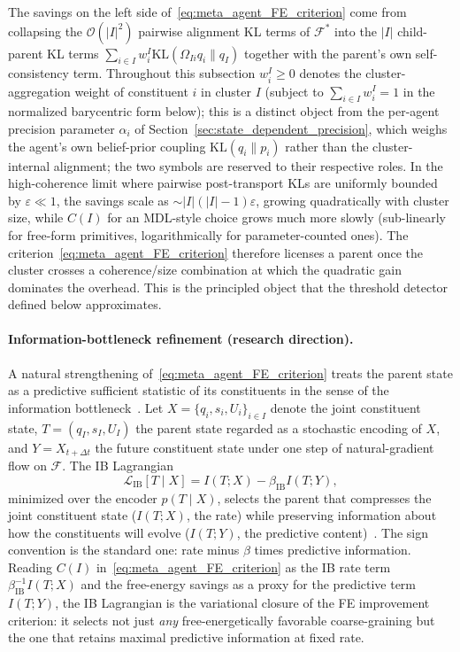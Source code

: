 \documentclass[11pt]{article}
\begin{document}
The savings on the left side of~\eqref{eq:meta_agent_FE_criterion} come from collapsing the $\mathcal{O}(|I|^2)$ pairwise alignment KL terms of $\mathcal{F}^*$ into the $|I|$ child-parent KL terms $\sum_{i \in I} w_i^I \mathrm{KL}(\Omega_{Ii}q_i \| q_I)$ together with the parent's own self-consistency term. Throughout this subsection $w_i^I \ge 0$ denotes the cluster-aggregation weight of constituent $i$ in cluster $I$ (subject to $\sum_{i \in I} w_i^I = 1$ in the normalized barycentric form below); this is a distinct object from the per-agent precision parameter $\alpha_i$ of Section~\ref{sec:state_dependent_precision}, which weighs the agent's own belief-prior coupling $\mathrm{KL}(q_i \| p_i)$ rather than the cluster-internal alignment; the two symbols are reserved to their respective roles. In the high-coherence limit where pairwise post-transport KLs are uniformly bounded by $\varepsilon \ll 1$, the savings scale as $\sim |I|(|I|-1)\varepsilon$, growing quadratically with cluster size, while $C(I)$ for an MDL-style choice grows much more slowly (sub-linearly for free-form primitives, logarithmically for parameter-counted ones). The criterion~\eqref{eq:meta_agent_FE_criterion} therefore licenses a parent once the cluster crosses a coherence/size combination at which the quadratic gain dominates the overhead. This is the principled object that the threshold detector defined below approximates.

\paragraph{Information-bottleneck refinement (research direction).} A natural strengthening of~\eqref{eq:meta_agent_FE_criterion} treats the parent state as a predictive sufficient statistic of its constituents in the sense of the information bottleneck~\cite{tishby1999information}. Let $X = \{q_i, s_i, U_i\}_{i \in I}$ denote the joint constituent state, $T = (q_I, s_I, U_I)$ the parent state regarded as a stochastic encoding of $X$, and $Y = X_{t+\Delta t}$ the future constituent state under one step of natural-gradient flow on $\mathcal{F}$. The IB Lagrangian
\begin{equation}
\mathcal{L}_{\mathrm{IB}}[T \mid X] = I(T;X) - \beta_{\mathrm{IB}}I(T;Y),
\label{eq:meta_agent_IB}
\end{equation}
minimized over the encoder $p(T \mid X)$, selects the parent that compresses the joint constituent state ($I(T;X)$, the rate) while preserving information about how the constituents will evolve ($I(T;Y)$, the predictive content)~\cite{bialek2001predictability}. The sign convention is the standard one: rate minus $\beta$ times predictive information. Reading $C(I)$ in~\eqref{eq:meta_agent_FE_criterion} as the IB rate term $\beta_{\mathrm{IB}}^{-1}I(T;X)$ and the free-energy savings as a proxy for the predictive term $I(T;Y)$, the IB Lagrangian is the variational closure of the FE improvement criterion: it selects not just \emph{any} free-energetically favorable coarse-graining but the one that retains maximal predictive information at fixed rate.
\end{document}
